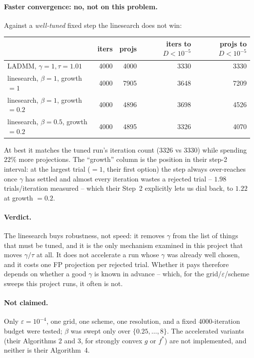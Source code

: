 \documentclass[11pt]{article}
\begin{document}
\paragraph{Faster convergence: no, not on this problem.} Against a
\emph{well-tuned} fixed step the linesearch does not win:
\begin{center}
\begin{tabular}{@{}lrrrr@{}}
\toprule
 & iters & projs & iters to $D<10^{-5}$ & projs to $D<10^{-5}$\\
\midrule
LADMM, $\gamma=1,\tau=1.01$              & 4000 & 4000 & 3330 & 3330\\
linesearch, $\beta=1$, growth $=1$       & 4000 & 7905 & 3648 & 7209\\
linesearch, $\beta=1$, growth $=0.2$     & 4000 & 4896 & 3698 & 4526\\
linesearch, $\beta=0.5$, growth $=0.2$   & 4000 & 4895 & 3326 & 4070\\
\bottomrule
\end{tabular}
\end{center}
At best it matches the tuned run's iteration count (3326 vs 3330) while spending
$22\%$ more projections. The ``growth'' column is the position in their step-2
interval: at the largest trial ($=1$, their first option) the step always
over-reaches once $\gamma$ has settled and almost every iteration wastes a
rejected trial -- $1.98$ trials/iteration measured -- which their Step~2
explicitly lets us dial back, to $1.22$ at growth $=0.2$.

\paragraph{Verdict.} The linesearch buys robustness, not speed: it removes
$\gamma$ from the list of things that must be tuned, and it is the only
mechanism examined in this project that moves $\gamma/\tau$ at all. It does not
accelerate a run whose $\gamma$ was already well chosen, and it costs one FP
projection per rejected trial. Whether it pays therefore depends on whether a
good $\gamma$ is known in advance -- which, for the grid/$\varepsilon$/scheme
sweeps this project runs, it often is not.

\paragraph{Not claimed.} Only $\varepsilon=10^{-4}$, one grid, one scheme, one
resolution, and a fixed 4000-iteration budget were tested; $\beta$ was swept
only over $\{0.25,\dots,8\}$. The accelerated variants (their Algorithms 2 and
3, for strongly convex $g$ or $f^*$) are not implemented, and neither is their
Algorithm~4.
\end{document}
